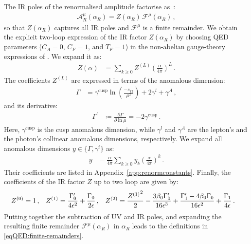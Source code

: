 \documentclass[main.tex]{subfiles}
\begin{document}
The IR poles of the renormalised amplitude factorise as~\cite{Catani:1998bh, Gardi:2009qi, Gardi:2009zv, Becher:2009cu, Becher:2009qa}:
\begin{align}
 \mathcal{A}^\mu_R (\alpha_R) = Z(\alpha_R) \,  \mathcal{F}^\mu(\alpha_R) \,,
\end{align}
so that $ Z(\alpha_R)$ captures all IR poles and $\mathcal{F}^\mu$ is a finite remainder.
We obtain the explicit two-loop expression of the IR factor $Z(\alpha_R)$ by
choosing QED parameters ($C_A=0$, $C_F=1$, and $T_F=1$) in the non-abelian gauge-theory expressions of . We expand it as:
\begin{align}
    Z(\alpha) &= \sum_{k\ge0} Z^{(L)} \left(\frac{\alpha}{4\pi}\right)^L \,.
\end{align}
The coefficients $Z^{(L)}$ are expressed in terms of the anomalous dimension:
\begin{align}
    \Gamma &= \gamma^\text{cusp}\ln\left(\frac{-s_{12}}{\mu^2}\right)+2\gamma^l+\gamma^A \,,
\end{align}
and its derivative:
\begin{align}
    \Gamma^\prime &\coloneqq \frac{\partial\Gamma}{\partial\ln\mu} = -2\gamma^\text{cusp} \,.
\end{align}
Here, $\gamma^\text{cusp}$ is the cusp anomalous dimension, while $\gamma^l$ and $\gamma^A$ are the lepton's and the photon's collinear anomalous dimensions, respectively.
We expand all anomalous dimensions $y\in\{\Gamma,\gamma^i\}$ as:
\begin{align}
    y &= \frac{\alpha}{4\pi} \sum_{k\ge0} y_k \left(\frac{\alpha}{4\pi}\right)^k \,.
\end{align}
Their coefficients are listed in Appendix~\ref{app:renormconstants}. Finally, the coefficients of the IR factor $Z$ up to two loop are given by:
\begin{align}
    \label{eq:ir-pole-coeffs}
    Z^{(0)} &= 1 \,, &
    Z^{(1)} &= \frac{\Gamma_0^\prime}{4\epsilon^2}+\frac{\Gamma_0}{2\epsilon} \,, &
    Z^{(2)} &= \frac{{Z^{(1)}}^2}{2} -\frac{3\beta_0\Gamma_0^\prime}{16\epsilon^3}+\frac{\Gamma_1^\prime-4\beta_0\Gamma_0}{16\epsilon^2}+\frac{\Gamma_1}{4\epsilon} \,.
\end{align}
Putting together the subtraction of UV and IR poles, and expanding the resulting finite remainder $\mathcal{F}^{\mu}(\alpha_R)$ in $\alpha_R$ leads to the definitions in \cref{eqQED:finite-remainders}.

\renewcommand{\theequation}{D.\arabic{equation}}
\end{document}

